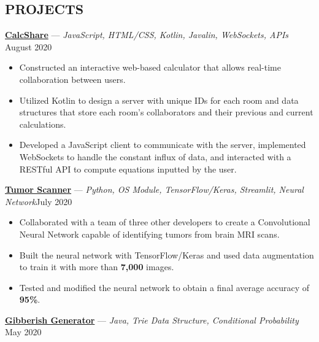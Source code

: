 \documentclass[11pt]{res}
\begin{document}
\begin{footnotesize}
\begin{resume}
\begin{small}
\section{PROJECTS}
\end{small} 
\vspace{.5mm}
\href{https://github.com/CharlesShi12/CalcShare}{\textbf{CalcShare}} — {\sl JavaScript, HTML/CSS, Kotlin, Javalin, WebSockets, APIs} \hfill August 2020\vspace{-5mm}
\begin{itemize}[leftmargin=6.25mm] \itemsep -2pt 
\item Constructed an interactive web-based calculator that allows real-time collaboration between users. 
\vspace{1mm}
\item Utilized Kotlin to design a server with unique IDs for each room and data structures that store each room's collaborators and their previous and current calculations.
\vspace{1mm}
\item Developed a JavaScript client to communicate with the server, implemented WebSockets to handle the constant influx of data, and interacted with a RESTful API to compute equations inputted by the user. 
\end{itemize}
\vspace{-2.5mm}
\href{https://github.com/CharlesShi12/AI_Tumor_Scanner}{\textbf{Tumor Scanner}} — {\sl Python, OS Module, TensorFlow/Keras, Streamlit, Neural Network}\hfill July 2020\vspace{-5mm}
\begin{itemize}[leftmargin=6.25mm] \itemsep -2pt 
\item Collaborated with a team of three other developers to create a Convolutional Neural Network capable of identifying tumors from brain MRI scans.
\vspace{1mm}
\item Built the neural network with TensorFlow/Keras and used data augmentation to train it with more than \textbf{7,000} images.
\vspace{1mm}
\item Tested and modified the neural network to obtain a final average accuracy of \textbf{95\%}. 
\end{itemize}
\vspace{-2.5mm}
\href{https://github.com/CharlesShi12/GibberishGenerator}{\textbf{Gibberish Generator}} — {\sl Java, Trie Data Structure, Conditional Probability} \hfill May 2020\vspace{-5mm}

\end{resume}
\end{footnotesize}
\end{document}
